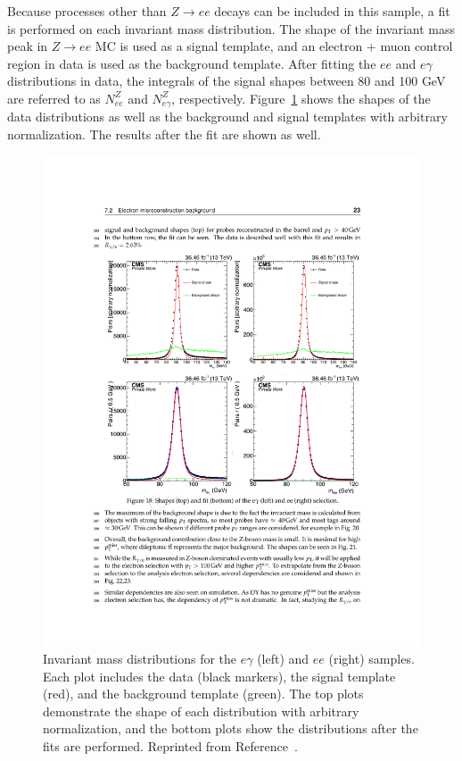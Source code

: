 Because processes other than $Z\rightarrow ee$ decays can be included in this sample, a fit is performed on each invariant mass distribution. The shape of the invariant mass peak in $Z\rightarrow ee$ MC is used as a signal template, and an electron + muon control region in data is used as the background template. After fitting the $ee$ and $e\gamma$ distributions in data, the integrals of the signal shapes between 80 and 100 GeV are referred to as $N_{ee}^Z$ and $N_{e\gamma}^Z$, respectively. 
Figure~\ref{fig:invMassShapes} shows the shapes of the data distributions as well as the background and signal templates with arbitrary normalization. The results after the fit are shown as well. 

\begin{figure}[h]
\begin{center}
\includegraphics[width=\textwidth]{Figures/DataAnalysis/EWKInvMassShapes.pdf}
\end{center}
\caption[Invariant mass distributions for the $e\gamma$ and $ee$ samples.]
{Invariant mass distributions for the $e\gamma$ (left) and $ee$ (right) samples. Each plot includes the data (black markers), 
the signal template (red), and the background template (green). The top plots demonstrate the shape of each distribution with arbitrary 
normalization, and the bottom plots show the distributions after the fits are performed. Reprinted from Reference~\cite{KnutAN}.
}
\label{fig:invMassShapes}
\end{figure}


